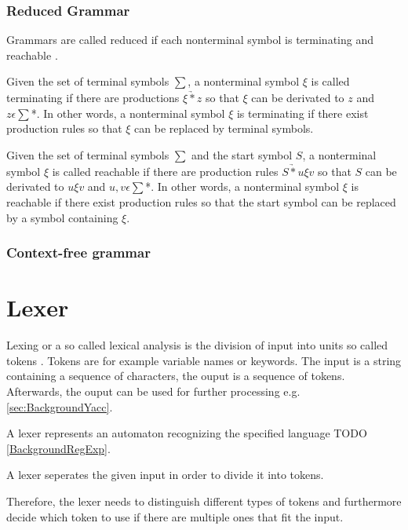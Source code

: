 \subsubsection{Reduced Grammar}
Grammars are called reduced if each nonterminal symbol is terminating and reachable \cite{Cremers75}.
 
Given the set of terminal symbols $\sum$, a nonterminal symbol $\xi$ is called terminating if there are productions $\xi \underrightarrow{*} z$ so that $\xi$ can be derivated to $z$ and $z \epsilon \sum$*. 
In other words, a nonterminal symbol $\xi$ is terminating if there exist production rules so that  $\xi$ can be replaced by terminal symbols. \cite{Cremers75}

Given the set of terminal symbols $\sum$ and the start symbol $S$, a nonterminal symbol $\xi$ is called reachable if there are production rules $S \underrightarrow{*} u\xi v$ so that $S$ can be derivated to $u\xi v$ and $u,v \epsilon \sum$*. 
In other words, a nonterminal symbol $\xi$ is reachable if there exist production rules so that the start symbol can be replaced by a symbol containing $\xi$. \cite{Cremers75}

\subsubsection{Context-free grammar}


\section{Lexer}\label{sec:BackgroundLexer}
Lexing or a so called lexical analysis is the division of input into units so called tokens \cite{LexYacc.1992}. Tokens are for example variable names or keywords.
The input is a string containing a sequence of characters, the ouput is a sequence of tokens. 
Afterwards, the ouput can be used for further processing e.g. \ref{sec:BackgroundYacc}.



A lexer represents an automaton recognizing the specified language TODO \ref{BackgroundRegExp}.

A lexer seperates the given input in order to divide it into tokens. 

Therefore, the lexer needs to distinguish different types of tokens and furthermore decide which token to use if there are multiple ones that fit the input. \cite{Mogensen.2017}


